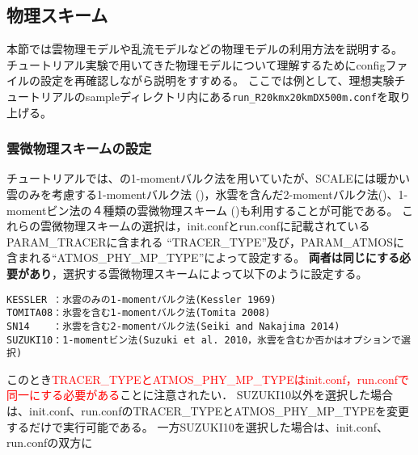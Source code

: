 \subsection{物理スキーム} \label{sec:adv_physics}
本節では雲物理モデルや乱流モデルなどの物理モデルの利用方法を説明する。
チュートリアル実験で用いてきた物理モデルについて理解するためにconfigファイルの設定を再確認しながら説明をすすめる。
ここでは例として、理想実験チュートリアルのsampleディレクトリ内にある\verb|run_R20kmx20kmDX500m.conf|を取り上げる。


\subsubsection{雲微物理スキームの設定} \label{sec:adv_microphys}
チュートリアルでは、\cite{tomita_2008}の1-momentバルク法を用いていたが、SCALEには暖かい雲のみを考慮する1-momentバルク法
(\cite{kessler_1969})，氷雲を含んだ2-momentバルク法(\cite{sn_2014})、1-momentビン法の４種類の雲微物理スキーム
(\cite{suzuki_etal_2010})も利用することが可能である。
これらの雲微物理スキームの選択は，init.confとrun.confに記載されているPARAM\_TRACERに含まれる
``TRACER\_TYPE''及び，PARAM\_ATMOSに含まれる``ATMOS\_PHY\_MP\_TYPE''によって設定する。
{\bf 両者は同じにする必要があり}，選択する雲微物理スキームによって以下のように設定する。

\begin{verbatim}
KESSLER ：水雲のみの1-momentバルク法(Kessler 1969)
TOMITA08：氷雲を含む1-momentバルク法(Tomita 2008)
SN14    ：氷雲を含む2-momentバルク法(Seiki and Nakajima 2014)
SUZUKI10：1-momentビン法(Suzuki et al. 2010，氷雲を含むか否かはオプションで選択)
\end{verbatim}

このとき\textcolor{red}{TRACER\_TYPEとATMOS\_PHY\_MP\_TYPEはinit.conf，run.confで同一にする必要がある}ことに注意されたい．
SUZUKI10以外を選択した場合は、init.conf、run.confのTRACER\_TYPEとATMOS\_PHY\_MP\_TYPEを変更するだけで実行可能である。
一方SUZUKI10を選択した場合は、init.conf、run.confの双方に\\

\\


